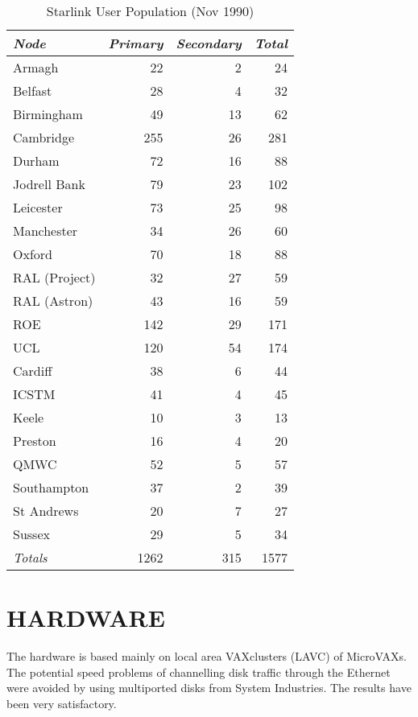 \begin{table}[htb]
\begin{center}
\begin{tabular}{||l|r|r|r||}
\hline
{\em Node} & {\em Primary} & {\em Secondary} & {\em Total}\\ 
\hline \hline
Armagh       &  22 &   2 &  24 \\
Belfast      &  28 &   4 &  32 \\
Birmingham   &  49 &  13 &  62 \\
Cambridge    & 255 &  26 & 281 \\
Durham       &  72 &  16 &  88 \\
Jodrell Bank &  79 &  23 & 102 \\
Leicester    &  73 &  25 &  98 \\
Manchester   &  34 &  26 &  60 \\
Oxford       &  70 &  18 &  88 \\
RAL (Project) & 32 &  27 &  59 \\
RAL (Astron) &  43 &  16 &  59 \\
ROE          & 142 &  29 & 171 \\
UCL          & 120 &  54 & 174 \\
\hline
Cardiff      &  38 &   6 &  44 \\
ICSTM        &  41 &   4 &  45 \\
Keele        &  10 &   3 &  13 \\
Preston      &  16 &   4 &  20 \\
QMWC         &  52 &   5 &  57 \\
Southampton  &  37 &   2 &  39 \\
St Andrews   &  20 &   7 &  27 \\
Sussex       &  29 &   5 &  34 \\
\hline \hline
{\em Totals} & 1262 & 315 & 1577\\
\hline
\end{tabular}
\caption {Starlink User Population (Nov 1990)}
\end{center}
\end{table}

\section {HARDWARE}

The hardware is based mainly on local area VAXclusters (LAVC) of MicroVAXs.
The potential speed problems of channelling disk traffic through the Ethernet
were avoided by using multiported disks from System Industries.
The results have been very satisfactory.

